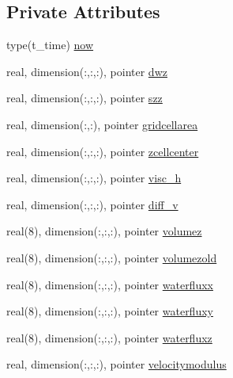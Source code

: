 \subsection*{Private Attributes}
\begin{DoxyCompactItemize}
\item 
type(t\+\_\+time) \mbox{\hyperlink{structmodulewaterproperties_1_1t__external_af68cd006798b776169acb40d5fdf4998}{now}}
\item 
real, dimension(\+:,\+:,\+:), pointer \mbox{\hyperlink{structmodulewaterproperties_1_1t__external_aee83ab80b31c4b914ac2aaf2442d15bf}{dwz}}
\item 
real, dimension(\+:,\+:,\+:), pointer \mbox{\hyperlink{structmodulewaterproperties_1_1t__external_afb5b4cd8e377262fd582731e9520cfca}{szz}}
\item 
real, dimension(\+:,\+:), pointer \mbox{\hyperlink{structmodulewaterproperties_1_1t__external_adb4004401e57b893404e9169e8ad0e2b}{gridcellarea}}
\item 
real, dimension(\+:,\+:,\+:), pointer \mbox{\hyperlink{structmodulewaterproperties_1_1t__external_ac5b889cf40bf7c1a479180336156a126}{zcellcenter}}
\item 
real, dimension(\+:,\+:,\+:), pointer \mbox{\hyperlink{structmodulewaterproperties_1_1t__external_a52e4fd523bb7cbd04ee50395bef9b942}{visc\+\_\+h}}
\item 
real, dimension(\+:,\+:,\+:), pointer \mbox{\hyperlink{structmodulewaterproperties_1_1t__external_a102af7c4fa04f9d6edd1f082cc59987a}{diff\+\_\+v}}
\item 
real(8), dimension(\+:,\+:,\+:), pointer \mbox{\hyperlink{structmodulewaterproperties_1_1t__external_a169d3a5524a37a336c636c92dbfe4341}{volumez}}
\item 
real(8), dimension(\+:,\+:,\+:), pointer \mbox{\hyperlink{structmodulewaterproperties_1_1t__external_add3777f7a6f1901a64a62a3800a9fec7}{volumezold}}
\item 
real(8), dimension(\+:,\+:,\+:), pointer \mbox{\hyperlink{structmodulewaterproperties_1_1t__external_abc6c3b48417c6c8ff334876a711695be}{waterfluxx}}
\item 
real(8), dimension(\+:,\+:,\+:), pointer \mbox{\hyperlink{structmodulewaterproperties_1_1t__external_a8db4e0766306b23f8ef69921f62c4073}{waterfluxy}}
\item 
real(8), dimension(\+:,\+:,\+:), pointer \mbox{\hyperlink{structmodulewaterproperties_1_1t__external_a23a335680da385b31b67890cc427fe51}{waterfluxz}}
\item 
real, dimension(\+:,\+:,\+:), pointer \mbox{\hyperlink{structmodulewaterproperties_1_1t__external_aa26e89e02439f406c7da398a869f8812}{velocitymodulus}}

\end{DoxyCompactItemize}
